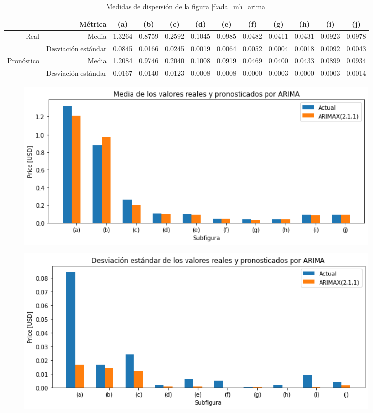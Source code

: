 \documentclass[a4paper,10pt]{article}
\begin{document}
\begin{table}[H]
 \begin{center}
 \resizebox{12cm}{!} {
  \begin{tabular}{|r|r|c|c|c|c|c|c|c|c|c|c|}
    & Métrica & (a) & (b) & (c) & (d) & (e) & (f) & (g) & (h) & (i) & (j) \\ \hline
    Real & Media & 1.3264& 0.8759& 0.2592& 0.1045& 0.0985& 0.0482& 0.0411& 0.0431& 0.0923& 0.0978   \\
    & Desviación estándar & 0.0845& 0.0166& 0.0245& 0.0019& 0.0064& 0.0052& 0.0004& 0.0018& 0.0092& 0.0043 \\
    Pronóstico & Media & 1.2084& 0.9746& 0.2040& 0.1008& 0.0919& 0.0469& 0.0400& 0.0433& 0.0899& 0.0934 \\
    & Desviación estándar & 0.0167& 0.0140& 0.0123& 0.0008& 0.0008& 0.0000 & 0.0003& 0.0000 & 0.0003& 0.0014 \\ \hline
  \end{tabular}
  }
  \caption{Medidas de dispersión de la figura \ref{f:ada_mh_arima}}
  \label{tab:ada_mh_avestd}
 \end{center}
\end{table}

\begin{figure}[H]
\centering
\includegraphics[width=0.9\textwidth]{./plots/arima/plots_ada_random_monthly/ave}
\label{f:ada_ave_mh}
\end{figure}


\begin{figure}[H]
\centering
\includegraphics[width=0.9\textwidth]{./plots/arima/plots_ada_random_monthly/std}
\label{f:ada_std_mh}
\end{figure}
\end{document}

